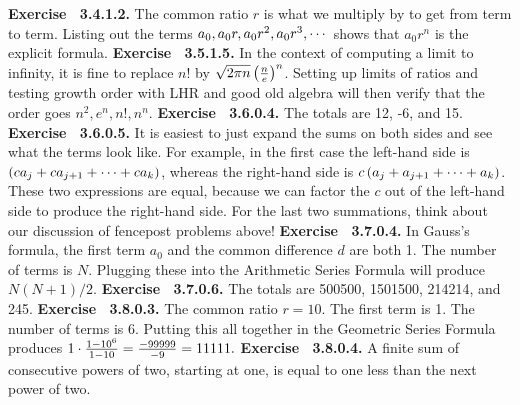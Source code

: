  {\noindent \protect \bf  Exercise ~3.4.1.2.} The common ratio $r$ is what we multiply by to get from term to term. Listing out the terms $a_0, a_0r, a_0r^2, a_0r^3,\protect \cdots  $ shows that $a_0r^n$ is the explicit formula. \protect \newline  \protect \newline  
 {\noindent \protect \bf  Exercise ~3.5.1.5.} In the context of computing a limit to infinity, it is fine to replace $n!$ by $\protect \sqrt  {2\pi n} \left ( \protect \frac  {n}{e} \right )^n$. Setting up limits of ratios and testing growth order with LHR and good old algebra will then verify that the order goes $n^2,e^n,n!,n^n$. \protect \newline  \protect \newline  
 {\noindent \protect \bf  Exercise ~3.6.0.4.} The totals are 12, -6, and 15. \protect \newline  \protect \newline  
 {\noindent \protect \bf  Exercise ~3.6.0.5.} It is easiest to just expand the sums on both sides and see what the terms look like. For example, in the first case the left-hand side is $\left (ca_j+ca_{j+1}+\protect \cdots  +ca_k\right )$, whereas the right-hand side is $c\left (a_j+a_{j+1}+\protect \cdots  +a_k\right )$. These two expressions are equal, because we can factor the $c$ out of the left-hand side to produce the right-hand side. For the last two summations, think about our discussion of fencepost problems above! \protect \newline  \protect \newline  
 {\noindent \protect \bf  Exercise ~3.7.0.4.}  In Gauss's formula, the first term $a_0$ and the common difference $d$ are both 1. The number of terms is $N$. Plugging these into the Arithmetic Series Formula will produce $N(N+1)/2$. \protect \newline  \protect \newline  
 {\noindent \protect \bf  Exercise ~3.7.0.6.} The totals are 500500, 1501500, 214214, and 245. \protect \newline  \protect \newline  
 {\noindent \protect \bf  Exercise ~3.8.0.3.} The common ratio $r=10$. The first term is 1. The number of terms is 6. Putting this all together in the Geometric Series Formula produces $1\cdot \protect \frac  {1-10^6}{1-10}=\protect \frac  {-99999}{-9}=11111.$ \protect \newline  \protect \newline  
 {\noindent \protect \bf  Exercise ~3.8.0.4.} A finite sum of consecutive powers of two, starting at one, is equal to one less than the next power of two. \protect \newline  \protect \newline  
